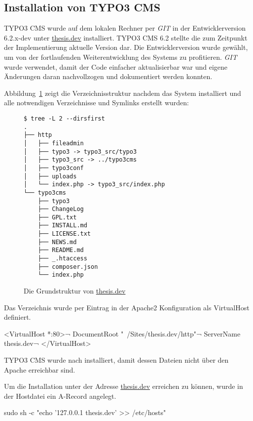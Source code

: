 \subsection{Installation von TYPO3 CMS}
\label{prototype:subsec:installTYPO3}
TYPO3 CMS wurde auf dem lokalen Rechner per \textit{GIT} in der Entwicklerversion 6.2.x-dev unter \url{thesis.dev} installiert. TYPO3 CMS 6.2 stellte die zum Zeitpunkt der Implementierung aktuelle Version dar. Die Entwicklerversion wurde gewählt, um von der fortlaufenden Weiterentwicklung des Systems zu profitieren. \textit{GIT} wurde verwendet, damit der Code einfacher aktualisierbar war und eigene Änderungen daran nachvollzogen und dokumentiert werden konnten.

Abbildung~\ref{lst:thesisDevFolders} zeigt die Verzeichnisstruktur nachdem das System installiert und alle notwendigen Verzeichnisse und Symlinks erstellt wurden:

\begin{figure}[H]
\begin{Verbatim}[samepage=true]
$ tree -L 2 --dirsfirst
.
├── http
│   ├── fileadmin
│   ├── typo3 -> typo3_src/typo3
│   ├── typo3_src -> ../typo3cms
│   ├── typo3conf
│   ├── uploads
│   └── index.php -> typo3_src/index.php
└── typo3cms
    ├── typo3
    ├── ChangeLog
    ├── GPL.txt
    ├── INSTALL.md
    ├── LICENSE.txt
    ├── NEWS.md
    ├── README.md
    ├── _.htaccess
    ├── composer.json
    └── index.php
\end{Verbatim}
\caption{Die Grundstruktur von \url{thesis.dev}}
\label{lst:thesisDevFolders}
\end{figure}

Das Verzeichnis  wurde per Eintrag in der Apache2 Konfiguration als VirtualHost definiert.

\begin{shcode}
<VirtualHost *:80>¬
DocumentRoot "~/Sites/thesis.dev/http"¬
ServerName thesis.dev¬
</VirtualHost>
\end{shcode}

TYPO3 CMS wurde nach  installiert, damit dessen Dateien nicht über den Apache erreichbar sind.

Um die Installation unter der Adresse \url{thesis.dev} erreichen zu können, wurde in der Hostdatei ein A-Record angelegt.

\begin{shcode}
sudo sh -c "echo '127.0.0.1 thesis.dev' >> /etc/hosts"
\end{shcode}


